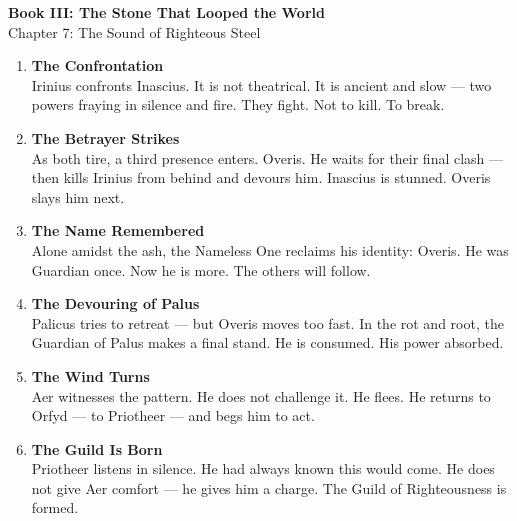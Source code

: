 \documentclass[9pt]{article}
\begin{document}
\begin{center}
    \Large\textbf{Book III: The Stone That Looped the World} \\
    \large Chapter 7: The Sound of Righteous Steel\\
\end{center}

\vspace{1in}

\begin{enumerate}
    \item \textbf{The Confrontation} \\
    Irinius confronts Inascius. It is not theatrical. It is ancient and slow — two powers fraying in silence and fire. They fight. Not to kill. To break.

    \vspace{1em}
    \item \textbf{The Betrayer Strikes} \\
    As both tire, a third presence enters. Overis. He waits for their final clash — then kills Irinius from behind and devours him. Inascius is stunned. Overis slays him next.

    \vspace{1em}
    \item \textbf{The Name Remembered} \\
    Alone amidst the ash, the Nameless One reclaims his identity: Overis. He was Guardian once. Now he is more. The others will follow.

    \vspace{1em}
    \item \textbf{The Devouring of Palus} \\
    Palicus tries to retreat — but Overis moves too fast. In the rot and root, the Guardian of Palus makes a final stand. He is consumed. His power absorbed.

    \vspace{1em}
    \item \textbf{The Wind Turns} \\
    Aer witnesses the pattern. He does not challenge it. He flees. He returns to Orfyd — to Priotheer — and begs him to act.

    \vspace{1em}
    \item \textbf{The Guild Is Born} \\
    Priotheer listens in silence. He had always known this would come. He does not give Aer comfort — he gives him a charge. The Guild of Righteousness is formed.


\end{enumerate}
\end{document}
